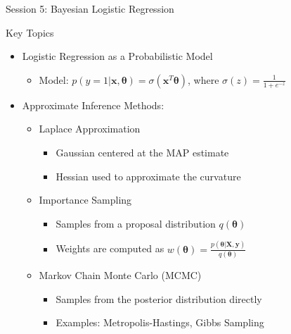 \documentclass{beamer}
\begin{document}
\begin{frame}{Session 5: Bayesian Logistic Regression}
  \begin{block}{Key Topics}
    \begin{itemize}
    \item Logistic Regression as a Probabilistic Model
      \begin{itemize}
        \item Model: $p(y=1|\boldsymbol{x}, \boldsymbol{\theta}) = \sigma(\boldsymbol{x}^T\boldsymbol{\theta})$, where $\sigma(z) = \frac{1}{1 + e^{-z}}$
      \end{itemize}
      \item Approximate Inference Methods:
        \begin{itemize}
        \item Laplace Approximation
          \begin{itemize}
            \item Gaussian centered at the MAP estimate
            \item Hessian used to approximate the curvature
          \end{itemize}
        \item Importance Sampling
          \begin{itemize}
            \item Samples from a proposal distribution $q(\boldsymbol{\theta})$
            \item Weights are computed as $w(\boldsymbol{\theta}) = \frac{p(\boldsymbol{\theta} | \boldsymbol{X}, \boldsymbol{y})}{q(\boldsymbol{\theta})}$
            \end{itemize}
          \item Markov Chain Monte Carlo (MCMC)
          \begin{itemize}
            \item Samples from the posterior distribution directly
            \item Examples: Metropolis-Hastings, Gibbs Sampling
            \end{itemize}
          \end{itemize}
\end{itemize}
  \end{block}
\end{frame}
\end{document}
